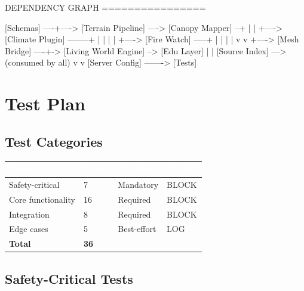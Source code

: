 \documentclass[11pt,letterpaper]{article}
\newcommand{\tableheader}[1]{\textbf{\sffamily\textcolor{white}{#1}}}
\begin{document}
\begin{asciibox}
DEPENDENCY GRAPH
================

  [Schemas] ----+----> [Terrain Pipeline] ----> [Canopy Mapper] --+
                |                                                   |
                +----> [Climate Plugin] --------+                   |
                |                               |                   |
                +----> [Fire Watch] -----+      |                   |
                |                        |      v                   v
                +----> [Mesh Bridge] ----+-> [Living World Engine] --> [Edu Layer]
                                                    |                       |
  [Source Index] ---> (consumed by all)              v                       v
                                              [Server Config] -------> [Tests]
\end{asciibox}

\section{Test Plan}

\subsection{Test Categories}

\begin{center}
\begin{tabularx}{\textwidth}{L{3cm}C{1.2cm}C{1.5cm}C{1.5cm}}
\toprule
{}
\tableheader{Category} & \tableheader{Count} & \tableheader{Priority} & \tableheader{On Fail} \\
\midrule
Safety-critical & 7 & Mandatory & BLOCK \\
Core functionality & 16 & Required & BLOCK \\
Integration & 8 & Required & BLOCK \\
Edge cases & 5 & Best-effort & LOG \\
\midrule
\textbf{Total} & \textbf{36} & & \\
\bottomrule
\end{tabularx}
\end{center}

\subsection{Safety-Critical Tests}
\end{document}
